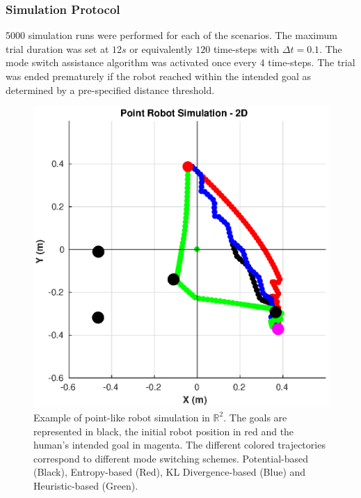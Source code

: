 \documentclass[conference]{IEEEtran}
\begin{document}
\subsubsection{Simulation Protocol}
5000 simulation runs were performed for each of the scenarios. 
The maximum trial duration was set at $12s$ or equivalently $120$ time-steps with $\Delta t = 0.1$. The mode switch assistance algorithm was activated once every $4$ time-steps. The trial was ended prematurely if the robot reached within the intended goal as determined by a pre-specified distance threshold. 
 \begin{figure}[h!]
	\centering
	\includegraphics[width= 0.8\hsize, height=0.26\vsize]{./figures/WS_SIM.eps}
	\vspace{-0.35cm}
	\caption{Example of point-like robot simulation in $\mathbb{R}^2$. The goals are represented in black, the initial robot position in red and the human's intended goal in magenta. The different colored trajectories correspond to different mode switching schemes. Potential-based (Black), Entropy-based (Red), KL Divergence-based (Blue) and Heuristic-based (Green).} 
	\label{fig:ws_sim}
\end{figure}
\end{document}
